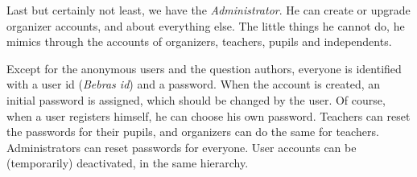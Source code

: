 Last but certainly not least, we have the \textit{Administrator}. He can create
or upgrade organizer accounts, and about everything else. The little things he
cannot do, he mimics through the accounts of organizers, teachers, pupils and
independents.

Except for the anonymous users and the question authors, everyone is identified
with a user id (\textit{Bebras id}) and a password. When the account is
created, an initial password is assigned, which should be changed by the user.
Of course, when a user registers himself, he can choose his own password.
Teachers can reset the passwords for their pupils, and organizers can do the
same for teachers. Administrators can reset passwords for everyone. User
accounts can be (temporarily) deactivated, in the same hierarchy.
